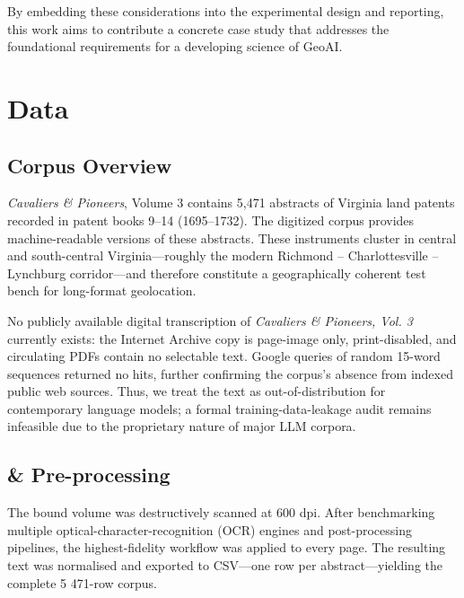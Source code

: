 By embedding these considerations into the experimental design and
reporting, this work aims to contribute a concrete case study that
addresses the foundational requirements for a developing science of
GeoAI.

\section{Data}\label{data}

\subsection{Corpus Overview}\label{corpus-overview}

\emph{Cavaliers \& Pioneers}, Volume 3 \citep{Nugent1979_cavaliers3}
contains 5,471 abstracts of Virginia land patents recorded in patent
books 9--14 (1695--1732). The digitized corpus
\citep{mioduski_2025_cvp3} provides machine-readable versions of these
abstracts. These instruments cluster in central and south-central
Virginia---roughly the modern Richmond -- Charlottesville -- Lynchburg
corridor---and therefore constitute a geographically coherent test bench
for long-format geolocation.

No publicly available digital transcription of \emph{Cavaliers \&
Pioneers, Vol. 3} currently exists: the Internet Archive copy is
page-image only, print-disabled, and circulating PDFs contain no
selectable text. Google queries of random 15-word sequences returned no
hits, further confirming the corpus's absence from indexed public web
sources. Thus, we treat the text as out-of-distribution for contemporary
language models; a formal training-data-leakage audit remains infeasible
due to the proprietary nature of major LLM corpora.

\subsection{\DIFdelbegin {}\DIFdelend \DIFaddbegin {}\DIFaddend \&
Pre-processing}\DIFdelbegin %
\DIFdelend \DIFaddbegin \label{digitization-pre-processing}
\DIFaddend 

The bound volume was destructively scanned at 600 dpi. After
benchmarking multiple optical-character-recognition (OCR) engines and
post-processing pipelines, the highest-fidelity workflow was applied to
every page. The resulting text was normalised and exported to CSV---one
row per abstract---yielding the complete 5 471-row corpus.

